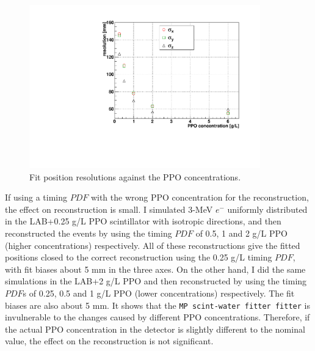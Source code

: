 \begin{figure}[!htb]
	\centering
	\includegraphics[width=10cm]{partialResolVsPPO.pdf}
	\caption{Fit position resolutions against the PPO concentrations.}
	\label{fig:partialResolVsPPO}
\end{figure}

If using a timing $PDF$ with the wrong PPO concentration for the reconstruction, the effect on reconstruction is small\cite{partialFitterPDFtestInvulnerable}. I simulated 3-MeV $e^-$ uniformly distributed in the LAB+0.25 g/L PPO scintillator with isotropic directions, and then reconstructed the events by using the timing $PDF$ of 0.5, 1 and 2 g/L PPO (higher concentrations) respectively. All of these reconstructions give the fitted positions closed to the correct reconstruction using the 0.25 g/L timing $PDF$, with fit biases about 5 mm in the three axes. On the other hand, I did the same simulations in the LAB+2 g/L PPO and then reconstructed by using the timing $PDF$s of 0.25, 0.5 and 1 g/L PPO  (lower concentrations) respectively. The fit biases are also about 5 mm. It shows that the \texttt{MP scint-water fitter fitter} is invulnerable to the changes caused by different PPO concentrations. Therefore, if the actual PPO concentration in the detector is slightly different to the nominal value, the effect on the reconstruction is not significant.

